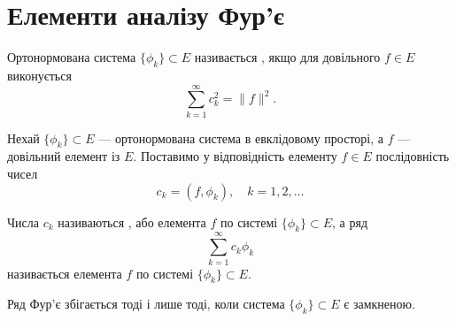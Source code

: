 \section{Елементи аналізу Фур'є}

\begin{definition}
Ортонормована система $\{\phi_k\} \subset E$
називається , якщо для довільного $f \in E$
виконується 
\begin{equation}
    \sum_{k = 1}^\infty c_k^2 = \|f\|^2.
\end{equation}
\end{definition}

\begin{definition}
Нехай $\{\phi_k\} \subset E$ --- ортонормована система в
евклідовому просторі, а $f$ --- довільний елемент із $E$.
Поставимо у відповідність елементу $f \in E$ послідовність
чисел
\begin{equation*}
    c_k = (f, \phi_k), \quad k = 1, 2, \dots
\end{equation*}

Числа $c_k$ називаються , або  елемента $f$ по системі $\{\phi_k\} \subset E$, а ряд
\begin{equation*}
    \sum_{k = 1}^\infty c_k \phi_k
\end{equation*}
називається  елемента $f$ по системі $\{\phi_k\} \subset E$.
\end{definition}

\begin{theorem}
Ряд Фур’є збігається тоді і лише тоді,
коли система $\{\phi_k\} \subset E$ є замкненою.
\end{theorem}

